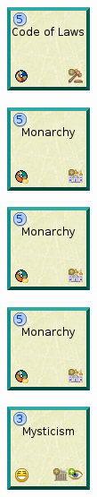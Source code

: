 \documentclass{article}
\begin{document}
\begin{figure}
  \begin{subfigure}{}
    \includegraphics[scale=1]{../rules/png/doe_tech_code_of_laws.png}
  \end{subfigure}
  \begin{subfigure}{}
    \includegraphics[scale=1]{../rules/png/doe_tech_monarchy.png}
  \end{subfigure}
  \begin{subfigure}{}
    \includegraphics[scale=1]{../rules/png/doe_tech_monarchy.png}
  \end{subfigure}
  \begin{subfigure}{}
    \includegraphics[scale=1]{../rules/png/doe_tech_monarchy.png}
  \end{subfigure}
  \begin{subfigure}{}
    \includegraphics[scale=1]{../rules/png/doe_tech_mysticism.png}
  \end{subfigure}
\end{figure}
\end{document}
